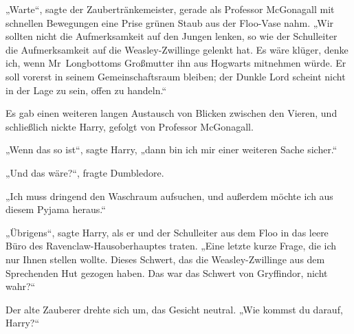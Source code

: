 „Warte“, sagte der Zaubertränkemeister, gerade als Professor McGonagall mit schnellen Bewegungen eine Prise grünen Staub aus der Floo-Vase nahm.
„Wir sollten nicht die Aufmerksamkeit auf den Jungen lenken, so wie der Schulleiter die Aufmerksamkeit auf die Weasley-Zwillinge gelenkt hat. Es wäre klüger, denke ich, wenn Mr~Longbottoms Großmutter ihn aus Hogwarts mitnehmen würde. Er soll vorerst in seinem Gemeinschaftsraum bleiben; der Dunkle Lord scheint nicht in der Lage zu sein, offen zu handeln.“

Es gab einen weiteren langen Austausch von Blicken zwischen den Vieren, und schließlich nickte Harry, gefolgt von Professor McGonagall.

„Wenn das so ist“, sagte Harry, „dann bin ich mir einer weiteren Sache sicher.“

„Und das wäre?“, fragte Dumbledore.

„Ich muss dringend den Waschraum aufsuchen, und außerdem möchte ich aus diesem Pyjama heraus.“

\later

„Übrigens“, sagte Harry, als er und der Schulleiter aus dem Floo in das leere Büro des Ravenclaw-Hausoberhauptes traten.
„Eine letzte kurze Frage, die ich nur Ihnen stellen wollte. Dieses Schwert, das die Weasley-Zwillinge aus dem Sprechenden Hut gezogen haben. Das war das Schwert von Gryffindor, nicht wahr?“

Der alte Zauberer drehte sich um, das Gesicht neutral.
„Wie kommst du darauf, Harry?“

